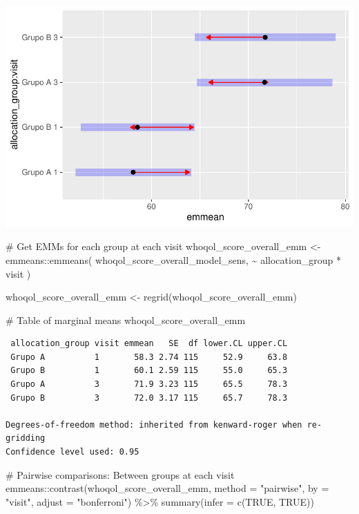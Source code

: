 \documentclass[
  letterpaper,
  DIV=11,
  numbers=noendperiod]{scrartcl}
\newenvironment{Shaded}{\begin{snugshade}}{\end{snugshade}}
\newcommand{\AttributeTok}[1]{\textcolor[rgb]{0.40,0.45,0.13}{#1}}
\newcommand{\CommentTok}[1]{\textcolor[rgb]{0.37,0.37,0.37}{#1}}
\newcommand{\ConstantTok}[1]{\textcolor[rgb]{0.56,0.35,0.01}{#1}}
\newcommand{\FunctionTok}[1]{\textcolor[rgb]{0.28,0.35,0.67}{#1}}
\newcommand{\NormalTok}[1]{\textcolor[rgb]{0.00,0.23,0.31}{#1}}
\newcommand{\OtherTok}[1]{\textcolor[rgb]{0.00,0.23,0.31}{#1}}
\newcommand{\SpecialCharTok}[1]{\textcolor[rgb]{0.37,0.37,0.37}{#1}}
\newcommand{\StringTok}[1]{\textcolor[rgb]{0.13,0.47,0.30}{#1}}
\begin{document}
\includegraphics{Outcomes_V1V2V3_files/figure-pdf/whoqol_score_overall_raw_emm-1.pdf}

\begin{Shaded}
\begin{Highlighting}[]
\CommentTok{\# Get EMMs for each group at each visit}
\NormalTok{whoqol\_score\_overall\_emm }\OtherTok{\textless{}{-}}\NormalTok{ emmeans}\SpecialCharTok{::}\FunctionTok{emmeans}\NormalTok{(}
\NormalTok{    whoqol\_score\_overall\_model\_sens, }
    \SpecialCharTok{\textasciitilde{}}\NormalTok{ allocation\_group }\SpecialCharTok{*}\NormalTok{ visit}
\NormalTok{)}

\NormalTok{whoqol\_score\_overall\_emm }\OtherTok{\textless{}{-}} \FunctionTok{regrid}\NormalTok{(whoqol\_score\_overall\_emm)}

\CommentTok{\# Table of marginal means}
\NormalTok{whoqol\_score\_overall\_emm}
\end{Highlighting}
\end{Shaded}

\begin{verbatim}
 allocation_group visit emmean   SE  df lower.CL upper.CL
 Grupo A          1       58.3 2.74 115     52.9     63.8
 Grupo B          1       60.1 2.59 115     55.0     65.3
 Grupo A          3       71.9 3.23 115     65.5     78.3
 Grupo B          3       72.0 3.17 115     65.7     78.3

Degrees-of-freedom method: inherited from kenward-roger when re-gridding 
Confidence level used: 0.95 
\end{verbatim}

\begin{Shaded}
\begin{Highlighting}[]
\CommentTok{\# Pairwise comparisons: Between groups at each visit}
\NormalTok{emmeans}\SpecialCharTok{::}\FunctionTok{contrast}\NormalTok{(whoqol\_score\_overall\_emm, }\AttributeTok{method =} \StringTok{"pairwise"}\NormalTok{, }\AttributeTok{by =} \StringTok{"visit"}\NormalTok{, }\AttributeTok{adjust =} \StringTok{"bonferroni"}\NormalTok{) }\SpecialCharTok{\%\textgreater{}\%} \FunctionTok{summary}\NormalTok{(}\AttributeTok{infer =} \FunctionTok{c}\NormalTok{(}\ConstantTok{TRUE}\NormalTok{, }\ConstantTok{TRUE}\NormalTok{))}
\end{Highlighting}
\end{Shaded}
\end{document}
